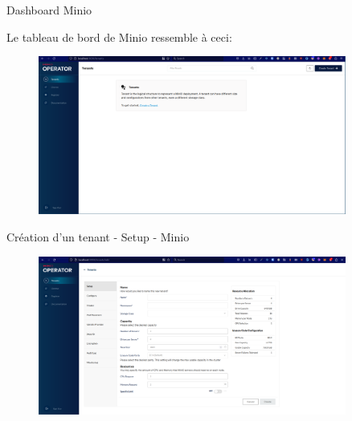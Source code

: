 
\begin{frame}[fragile]{Dashboard Minio}

   Le tableau de bord de Minio ressemble à ceci:
\begin{figure}
\begin{center}
\includegraphics[angle=0, width=0.9\textwidth, height=0.8\textheight]{images/console_minio.eps}
\end{center}
\end{figure}

\end{frame}


\begin{frame}[fragile]{Création d'un tenant - Setup - Minio}

\begin{figure}
\begin{center}
\includegraphics[angle=0, width=0.9\textwidth, height=0.8\textheight]{images/setup_minio.eps}
\end{center}
\end{figure}

\end{frame}

